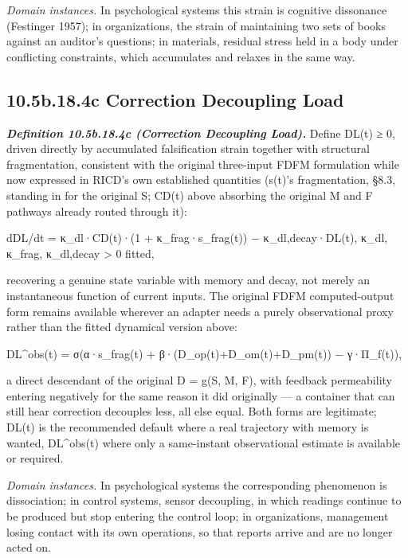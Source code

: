 \documentclass[
]{article}
\begin{document}
\emph{Domain instances.} In psychological systems this strain is
cognitive dissonance (Festinger 1957); in organizations, the strain of
maintaining two sets of books against an auditor's questions; in
materials, residual stress held in a body under conflicting constraints,
which accumulates and relaxes in the same way.

\hypertarget{b.18.4c-correction-decoupling-load}{%
\subsection{10.5b.18.4c Correction Decoupling
Load}\label{b.18.4c-correction-decoupling-load}}

\emph{\textbf{Definition 10.5b.18.4c (Correction Decoupling Load).}}
Define DL(t) ≥ 0, driven directly by accumulated falsification strain
together with structural fragmentation, consistent with the original
three-input FDFM formulation while now expressed in RICD's own
established quantities (s(t)'s fragmentation, §8.3, standing in for the
original S; CD(t) above absorbing the original M and F pathways already
routed through it):

dDL/dt = κ\_dl·CD(t)·(1 + κ\_frag·s\_frag(t)) − κ\_dl,decay·DL(t),
κ\_dl, κ\_frag, κ\_dl,decay \textgreater{} 0 fitted,

recovering a genuine state variable with memory and decay, not merely an
instantaneous function of current inputs. The original FDFM
computed-output form remains available wherever an adapter needs a
purely observational proxy rather than the fitted dynamical version
above:

DL\^{}obs(t) = σ(α·s\_frag(t) + β·(D\_op(t)+D\_om(t)+D\_pm(t)) −
γ·Π\_f(t)),

a direct descendant of the original D = g(S, M, F), with feedback
permeability entering negatively for the same reason it did originally
--- a container that can still hear correction decouples less, all else
equal. Both forms are legitimate; DL(t) is the recommended default where
a real trajectory with memory is wanted, DL\^{}obs(t) where only a
same-instant observational estimate is available or required.

\emph{Domain instances.} In psychological systems the corresponding
phenomenon is dissociation; in control systems, sensor decoupling, in
which readings continue to be produced but stop entering the control
loop; in organizations, management losing contact with its own
operations, so that reports arrive and are no longer acted on.
\end{document}
